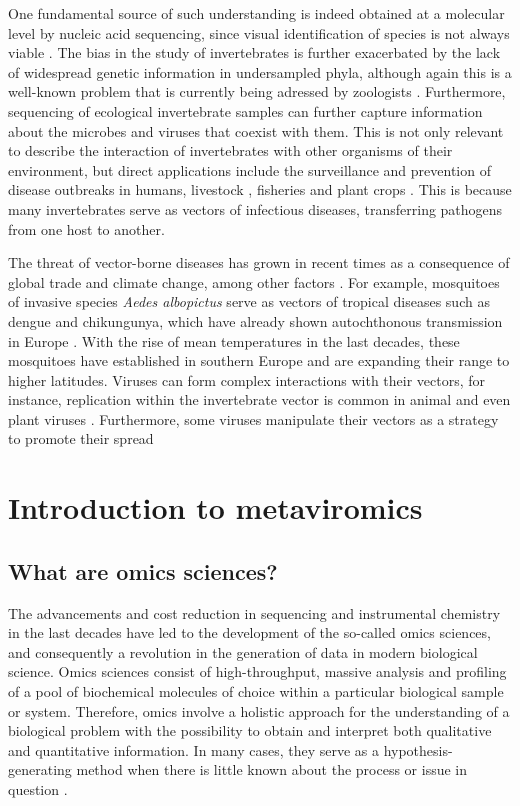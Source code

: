 \documentclass[
  openany]{book}
\begin{document}
One fundamental source of such understanding is indeed obtained at a molecular level by nucleic acid sequencing, since visual identification of species is not always viable \autocite{Chen2021}. The bias in the study of invertebrates is further exacerbated by the lack of widespread genetic information in undersampled phyla, although again this is a well-known problem that is currently being adressed by zoologists \autocite{Laumer2019}. Furthermore, sequencing of ecological invertebrate samples can further capture information about the microbes and viruses that coexist with them. This is not only relevant to describe the interaction of invertebrates with other organisms of their environment, but direct applications include the surveillance and prevention of disease outbreaks in humans, livestock \autocite{Modha2019}, fisheries \autocite{Ferguson2010} and plant crops \autocite{Kondo2020}. This is because many invertebrates serve as vectors of infectious diseases, transferring pathogens from one host to another.

The threat of vector-borne diseases has grown in recent times as a consequence of global trade and climate change, among other factors \autocite{Baker2021}. For example, mosquitoes of invasive species \emph{Aedes albopictus} serve as vectors of tropical diseases such as dengue and chikungunya, which have already shown autochthonous transmission in Europe \autocite{Gossner2022,Tjaden2021}. With the rise of mean temperatures in the last decades, these mosquitoes have established in southern Europe and are expanding their range to higher latitudes. Viruses can form complex interactions with their vectors, for instance, replication within the invertebrate vector is common in animal and even plant viruses \autocite{He2020}. Furthermore, some viruses manipulate their vectors as a strategy to promote their spread \autocite{Eigenbrode2018,Jayasinghe2021}

\hypertarget{introduction-to-metaviromics}{%
\section{Introduction to metaviromics}\label{introduction-to-metaviromics}}

\hypertarget{what-are-omics-sciences}{%
\subsection{What are omics sciences?}\label{what-are-omics-sciences}}

The advancements and cost reduction in sequencing and instrumental chemistry in the last decades have led to the development of the so-called omics sciences, and consequently a revolution in the generation of data in modern biological science. Omics sciences consist of high-throughput, massive analysis and profiling of a pool of biochemical molecules of choice within a particular biological sample or system. Therefore, omics involve a holistic approach for the understanding of a biological problem with the possibility to obtain and interpret both qualitative and quantitative information. In many cases, they serve as a hypothesis-generating method when there is little known about the process or issue in question \autocite{Vailati-Riboni2017}.
\end{document}
